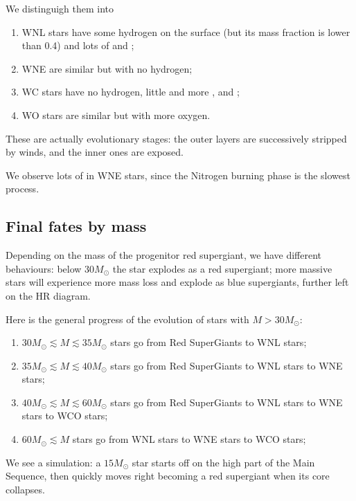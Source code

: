 \documentclass[main.tex]{subfiles}
\begin{document}
We distinguigh them into 
\begin{enumerate}
    \item WNL stars have some hydrogen on the surface (but its mass fraction is lower than \num{.4}) and lots of  and ;
    \item WNE are similar but with no hydrogen;
    \item WC stars have no hydrogen, little  and more ,  and ;
    \item WO stars are similar but with more oxygen.
\end{enumerate}

These are actually evolutionary stages: the outer layers are successively stripped by winds, and the inner ones are exposed.

We observe lots of  in WNE stars, since the Nitrogen burning phase is the slowest process. 


\subsection{Final fates by mass}

Depending on the mass of the progenitor red supergiant, we have different behaviours: below \(30 M_{\odot} \) the star explodes as a red supergiant; more massive stars will experience more mass loss and explode as blue supergiants, further left on the HR diagram. 

Here is the general progress of the evolution of stars with \(M > 30 M_{\odot}\):
\begin{enumerate}
  \item \(30 M_{\odot} \lesssim M \lesssim 35 M_{\odot}\) stars go from Red SuperGiants to WNL stars;
  \item \(35 M_{\odot} \lesssim M \lesssim 40 M_{\odot}\) stars go from Red SuperGiants to WNL stars to WNE stars;
  \item \(40 M_{\odot} \lesssim M \lesssim 60 M_{\odot}\) stars go from Red SuperGiants to WNL stars to WNE stars to WCO stars;
  \item \(60 M_{\odot} \lesssim M \) stars go from WNL stars to WNE stars to WCO stars;
\end{enumerate}

We see a simulation: a \(15 M_{\odot}  \) star starts off on the high part of the Main Sequence, then quickly moves right becoming a red supergiant when its core collapses.
\end{document}

